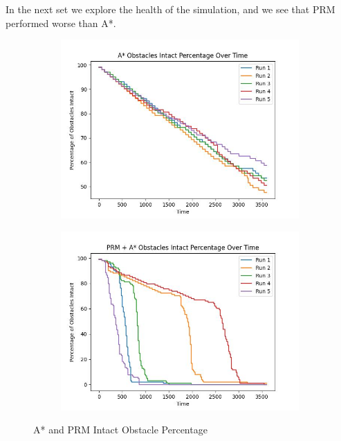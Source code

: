 \documentclass{article}
\begin{document}
In the next set we explore the health of the simulation, and we see that PRM performed worse than A*.

\begin{figure}[H]
    \centering
    \begin{subfigure}{0.4\textwidth}
        \centering
        \includegraphics[width = \textwidth]{imgs/astar_obstacles_intact.jpg}
    \end{subfigure}
    \begin{subfigure}{0.4\textwidth}
        \centering
        \includegraphics[width = \textwidth]{imgs/prm_obstacles_intact.jpg}
    \end{subfigure}
    \caption{A* and PRM Intact Obstacle Percentage}
    \label{fig:intact}
\end{figure}
\end{document}

